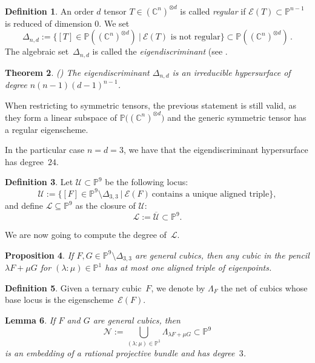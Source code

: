 \documentclass[11pt, a4paper, reqno, captions=tableheading,bibliography=totoc]{scrartcl}
\theoremstyle{plain}
\newtheorem{lemma}{Lemma}[section]
\newtheorem{prop}[lemma]{Proposition}
\newtheorem{theorem}[lemma]{Theorem}
\theoremstyle{definition}
\newtheorem{definition}[lemma]{Definition}
\newcommand{\C}{\mathbb{C}}
\newcommand{\p}{\mathbb{P}}
\newcommand{\Eig}[1]{\mathcal{E}\!\left( {#1} \right)}
\begin{document}
\begin{definition}
An order $d$ tensor $T \in (\C^n)^{\otimes d}$ is called \emph{regular} if $\Eig{T} \subset \p^{n-1}$ is reduced of dimension $0$.
We set
%
\[
\Delta_{n,d}:=\{[T]\in \p ((\C^n)^{\otimes d}) \ | \ \Eig{T} \textrm{\ is \ not \ regular} \}\subset \p ((\C^n)^{\otimes d}) \,.
\]
%
The algebraic set~$\Delta_{n,d}$ is called the \emph{eigendiscriminant} (see \cite[Definition~5.5]{Abo}.
\end{definition}

\begin{theorem}(\cite[Corollary 5.8]{Abo})
The eigendiscriminant $\Delta_{n,d}$ is an irreducible hypersurface of degree $n(n-1)(d-1)^{n-1}$.
\end{theorem}

When restricting to symmetric tensors, the previous statement is still valid, as they form a linear subspace of
$\p \bigl((\C^n)^{\otimes d}\bigr)$ and the generic symmetric tensor has a regular eigenscheme.

In the particular case $n=d=3$, we have that the eigendiscriminant hypersurface has degree~$24$.

\begin{definition}
Let $\mathcal{U} \subset \p^9$ be the following locus:
%
\[
\mathcal{U} := \{[F]\in \p^9 \setminus \Delta_{3,3} \ | \ \Eig{F} \ \textrm {contains \ a \ unique \ aligned \ triple}\},
\]
%
and define $\mathcal{L} \subseteq \p^9$ as the closure of $\mathcal{U}$:
%
\[
 \mathcal{L} := \overline{\mathcal{U}} \subset \p^9.
\]
%
\end{definition}

We are now going to compute the degree of~$\mathcal{L}$.

\begin{prop}
 If $F, G \in \p^9 \setminus \Delta_{3,3}$ are general cubics, then any cubic in the pencil $\lambda F + \mu G$ for $(\lambda: \mu) \in \p^1$ has at most one aligned triple of eigenpoints.
\end{prop}

\begin{definition}
 Given a ternary cubic~$F$, we denote by $\Lambda_F$ the net of cubics whose base locus is the eigenscheme~$\Eig{F}$.
\end{definition}

\begin{lemma}
\label{lemma:scroll}
 If $F$ and $G$ are general cubics, then
 \[
   \mathcal{N} := \bigcup_{(\lambda : \mu) \in \p^1} \Lambda_{\lambda F + \mu G} \subset \p^9
 \]
 is an embedding of a rational projective bundle and has degree~$3$.
\end{lemma}
\end{document}
